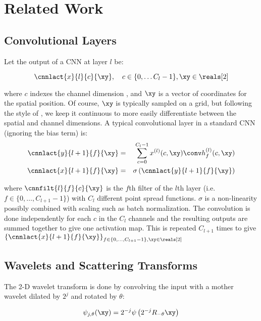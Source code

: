 \section{Related Work}\label{sec:background}

\subsection{Convolutional Layers}\label{sec:conv_layer}

Let the output of a CNN at layer $l$ be:

$$ \cnnlact{x}{l}{c}{\xy}, \quad c\in \{0, \ldots C_l-1\}, \xy \in \reals[2]$$

where $c$ indexes the channel dimension , and $\xy$ is a vector of coordinates
for the spatial position. Of course, $\xy$ is typically sampled on a grid, but
following the style of \cite{qiu_dcfnet:_2018}, we keep it continuous to
more easily differentiate between the spatial and channel dimensions. A typical
convolutional layer in a standard CNN (ignoring the bias term) is:
%
\begin{eqnarray} 
  \cnnlact{y}{l+1}{f}{\xy} &=& \sum_{c=0}^{C_l - 1}  x^{(l)}(c,\xy) \conv h^{(l)}_{f}(c, \xy)
    \label{eq:conv}\\
    \cnnlact{x}{l+1}{f}{\xy} & = & \sigma \left( \cnnlact{y}{l+1}{f}{\xy} \right) \label{eq:nonlin}
\end{eqnarray}

where $\cnnfilt{l}{f}{c}{\xy}$ is the $f$th filter of the $l$th layer (i.e. $f \in \{0,
\ldots, C_{l+1}-1 \}$) with $C_l$ different point spread functions. $\sigma$ is a non-linearity 
possibly combined with scaling such as batch normalization. The convolution
is done independently for each $c$ in the $C_l$ channels and the resulting outputs are
summed together to give one activation map. This is repeated $C_{l+1}$ times to
give $\left\{ \cnnlact{x}{l+1}{f}{\xy} \right\}_{f \in \{0, \ldots, C_{l+1}-1 \}, \xy \in \reals[2]}$

\subsection{Wavelets and Scattering Transforms}\label{sec:scatternet}
The 2-D wavelet transform is done by convolving the input with a mother wavelet
dilated by $2^j$ and rotated by $\theta$:

\begin{equation}
  \psi_{j, \theta}(\xy) = 2^{-j}\psi \left(2^{-j} R_{-\theta} \xy\right)
\end{equation}

